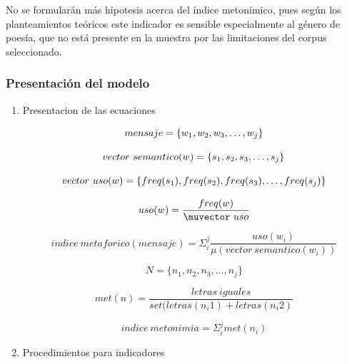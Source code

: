 \documentclass[twoside]{article}
\begin{document}
No se formularán más hipotesis acerca del índice metonímico, pues según los planteamientos teóricos este indicador
es sensible especialmente al género de poesía, que no está presente en la muestra por las limitaciones del corpus
seleccionado.



\subsubsection{Presentación del modelo}
\label{sec:orgeb95ec0}
\begin{enumerate}
\item Presentacion de las ecuaciones
\label{sec:org71c682a}

      \begin{equation}
mensaje = \{ w_1, w_2, w_3, \dots , w_j \} \\
\end{equation}

\begin{equation}
vector\ semantico(w) = \{s_1, s_2, s_3, \dots, s_j \} \\
\end{equation}

\begin{equation}
vector\ uso(w) = \{freq(s_1),freq(s_2),freq(s_3), \dots, freq(s_j) \} \\
\end{equation}

\begin{equation}
uso(w) = \frac{freq(w)}{\muvector\ uso}
\end{equation}


\begin{equation}
indice\ metaforico(mensaje) =  \Sigma_i^j \frac{uso(w_i)}{\mu( vector\ semantico(w_i))}
\end{equation}


\begin{equation}
N = \{n_1, n_2, n_3, \dots , n_j\}
\end{equation}

\begin{equation}
met(n) = \frac{letras\ iguales}{ set(letras(n_i1) + letras(n_i2)}
\end{equation}

\begin{equation}
indice\ metonimia = \Sigma_i^j met(n_i)
\end{equation}

\item Procedimientos para indicadores
\label{sec:orge40eb73}


\end{enumerate}
\end{document}
